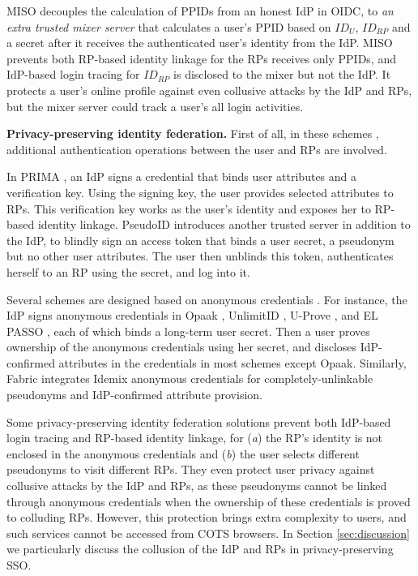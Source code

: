 MISO \cite{miso} decouples the calculation of PPIDs from an honest IdP in OIDC,
 to \emph{an extra trusted mixer server} that calculates a user's PPID based on $ID_U$, $ID_{RP}$ and a secret after it receives the authenticated user's identity from the IdP.
MISO prevents both RP-based identity linkage for the RPs receives only PPIDs,
    and IdP-based login tracing for $ID_{RP}$ is disclosed to the mixer but not the IdP.
It protects a user's online profile against even collusive attacks by the IdP and RPs,
    but the mixer server could track a user's all login activities.

\noindent\textbf{Privacy-preserving identity federation.}
First of all, in these schemes \cite{prima,PseudoID,Opaak, ELPASSO,uprov,UnlimitID,hyperledge-idemix},
    additional authentication operations between the user and RPs are involved.

In PRIMA \cite{prima}, an IdP signs a credential
that binds user attributes and a verification key. Using the signing key, the user provides selected attributes to RPs. This verification key works as the user's identity and exposes her to RP-based identity linkage.
PseudoID \cite{PseudoID} introduces another trusted server in addition to the IdP,
 to blindly sign \cite{blind-sign}
an access token that binds a user secret, a pseudonym but no other user attributes.
The user then unblinds this token,
    authenticates herself to an RP using the secret,
        and log into it.

Several schemes \cite{Opaak, hyperledge-idemix, uprov, UnlimitID, ELPASSO} are designed based on anonymous credentials \cite{anon-credential-2001, idemix, anon-credential}.
For instance, the IdP signs anonymous credentials in Opaak \cite{Opaak}, UnlimitID \cite{UnlimitID}, U-Prove \cite{uprov}, and EL PASSO \cite{ELPASSO}, each of which binds a long-term user secret. %
Then a user proves ownership of the anonymous credentials using her secret,
     and discloses IdP-confirmed attributes in the credentials in most schemes except Opaak.
Similarly, Fabric \cite{hyperledge-idemix} integrates Idemix anonymous credentials \cite{idemix} for completely-unlinkable pseudonyms and IdP-confirmed attribute provision.


Some privacy-preserving identity federation solutions \cite{PseudoID,Opaak,ELPASSO,uprov,UnlimitID,hyperledge-idemix} prevent both IdP-based login tracing and RP-based identity linkage, for (\emph{a}) the RP's identity is not enclosed in the anonymous credentials and (\emph{b}) the user selects different pseudonyms to visit different RPs.
They even protect user privacy against collusive attacks by the IdP and RPs, as these pseudonyms cannot be linked through anonymous credentials \cite{anon-credential-2001, idemix, anon-credential} when the ownership of these credentials is proved to colluding RPs. %
However, this protection brings extra complexity to users,
        and such services cannot be accessed from COTS browsers.
In Section \ref{sec:discussion}
we particularly discuss the collusion of the IdP and RPs in privacy-preserving SSO.


